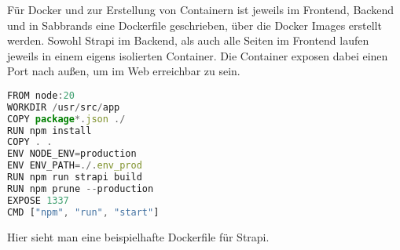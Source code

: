Für Docker und zur Erstellung von Containern ist jeweils im Frontend, Backend und in Sabbrands eine Dockerfile geschrieben, über die Docker Images erstellt werden. Sowohl Strapi im Backend, als auch alle Seiten im Frontend laufen jeweils in einem eigens isolierten Container. Die Container exposen dabei einen Port nach außen, um im Web erreichbar zu sein.

\begin{lstlisting}[language=JavaScript, caption={Dockerfile Strapi}, label={lst:dockerfileStrapi}]
FROM node:20              
WORKDIR /usr/src/app      
COPY package*.json ./     
RUN npm install           
COPY . .                  
ENV NODE_ENV=production
ENV ENV_PATH=./.env_prod
RUN npm run strapi build
RUN npm prune --production
EXPOSE 1337      
CMD ["npm", "run", "start"]
\end{lstlisting}

Hier sieht man eine beispielhafte Dockerfile für Strapi.